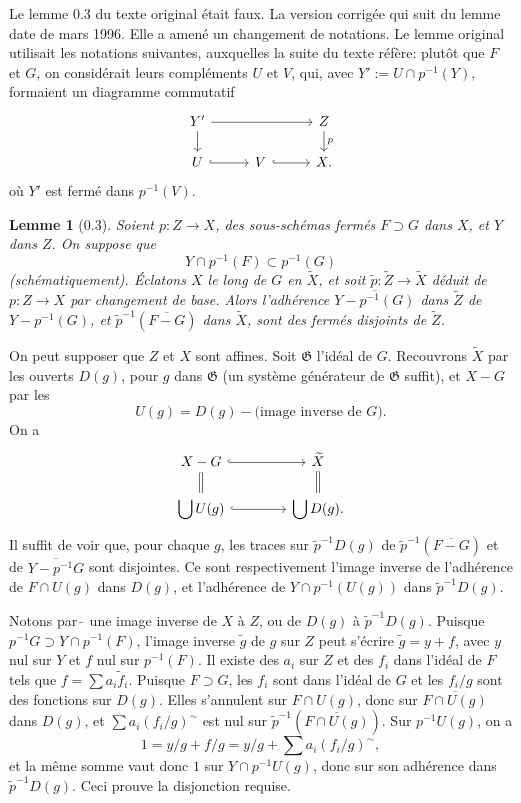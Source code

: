 \documentclass[10pt,a4paper]{article}
\theoremstyle{deligne}
\newtheorem*{lemma*}{Lemme}
\begin{document}
Le lemme 0.3 du texte original était faux. La version corrigée qui suit du lemme date de mars 1996. Elle a amené un changement de notations. Le lemme original utilisait les notations suivantes, auxquelles la suite du texte réfère: plutôt que \(F\) et \(G\), on considérait leurs compléments \(U\) et \(V\), qui, avec \(Y':=U\cap p^{-1}(Y)\), formaient un diagramme commutatif
\[
\begin{tikzcd}[column sep=2.7em,row sep=1.5em]
Y' \arrow[rr] \arrow[d] && Z \arrow[d,"p"] \\
U \arrow[r,hook] & V \arrow[r,hook] & X .
\end{tikzcd}
\]
où \(Y'\) est fermé dans \(p^{-1}(V)\).

\begin{lemma*}[0.3]
Soient \(p:Z\to X\), des sous-schémas fermés \(F\supset G\) dans \(X\), et \(Y\) dans \(Z\). On suppose que
\[
Y\cap p^{-1}(F)\subset p^{-1}(G)
\]
(schématiquement). Éclatons \(X\) le long de \(G\) en \(\widetilde X\), et soit \(\widetilde p:\widetilde Z\to\widetilde X\) déduit de \(p:Z\to X\) par changement de base. Alors l'adhérence \(\overline{Y-p^{-1}(G)}\) dans \(\widetilde Z\) de \(Y-p^{-1}(G)\), et \(\widetilde p^{-1}(\overline{F-G})\) dans \(\widetilde X\), sont des fermés disjoints de \(\widetilde Z\).
\end{lemma*}

On peut supposer que \(Z\) et \(X\) sont affines. Soit \(\mathfrak G\) l'idéal de \(G\). Recouvrons \(\widetilde X\) par les ouverts \(D(g)\), pour \(g\) dans \(\mathfrak G\) (un système générateur de \(\mathfrak G\) suffit), et \(X-G\) par les
\[
U(g)=D(g)-\text{(image inverse de }G\text{)}.
\]
On a
\[
\begin{tikzcd}[column sep=4em,row sep=1.5em]
X-G \arrow[r,hook] \arrow[d,equal] & \widetilde X \arrow[d,equal] \\
\displaystyle\bigcup U(g) \arrow[r,hook] & \displaystyle\bigcup D(g).
\end{tikzcd}
\]
Il suffit de voir que, pour chaque \(g\), les traces sur \(\widetilde p^{-1}D(g)\) de \(\widetilde p^{-1}(\overline{F-G})\) et de \(\overline{Y-p^{-1}G}\) sont disjointes. Ce sont respectivement l'image inverse de l'adhérence de \(F\cap U(g)\) dans \(D(g)\), et l'adhérence de \(Y\cap p^{-1}(U(g))\) dans \(\widetilde p^{-1}D(g)\).

Notons par \(\widetilde{\ }\) une image inverse de \(X\) à \(Z\), ou de \(D(g)\) à \(\widetilde p^{-1}D(g)\). Puisque \(p^{-1}G\supset Y\cap p^{-1}(F)\), l'image inverse \(\widetilde g\) de \(g\) sur \(Z\) peut s'écrire \(\widetilde g=y+f\), avec \(y\) nul sur \(Y\) et \(f\) nul sur \(p^{-1}(F)\). Il existe des \(a_i\) sur \(Z\) et des \(f_i\) dans l'idéal de \(F\) tels que \(f=\sum a_i\widetilde f_i\). Puisque \(F\supset G\), les \(f_i\) sont dans l'idéal de \(G\) et les \(f_i/g\) sont des fonctions sur \(D(g)\). Elles s'annulent sur \(F\cap U(g)\), donc sur \(\overline{F\cap U(g)}\) dans \(D(g)\), et \(\sum a_i(f_i/g)^{\sim}\) est nul sur \(\widetilde p^{-1}(\overline{F\cap U(g)})\). Sur \(p^{-1}U(g)\), on a
\[
1=y/g+f/g=y/g+\sum a_i(f_i/g)^{\sim},
\]
et la même somme vaut donc \(1\) sur \(Y\cap p^{-1}U(g)\), donc sur son adhérence dans \(\widetilde p^{-1}D(g)\). Ceci prouve la disjonction requise.
\end{document}

